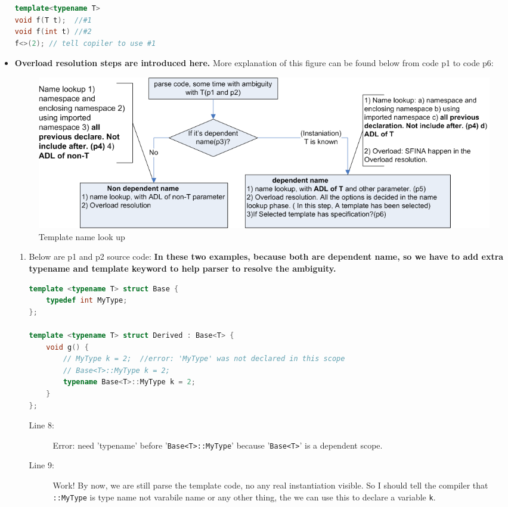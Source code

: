 \documentclass[a4paper,11pt,twoside]{book}
\begin{document}
\begin{itemize}
\begin{lstlisting}[frame=single, language=c++]
template<typename T>
void f(T t);  //#1
void f(int t) //#2
f<>(2); // tell copiler to use #1
\end{lstlisting}

    \item \textbf{Overload resolution steps are introduced here.} More explanation of this figure can be found below from code p1 to code p6:

\begin{figure}[ht]
	\centering 
	\includegraphics[width=0.8\linewidth]{pics/template.png}
	\caption{Template name look up}
	\label{fig:command}
\end{figure}

\begin{enumerate}

\item Below are p1 and p2 source code: \textbf{In these two examples, because both are dependent name, so we have to add extra typename and template keyword to help parser to resolve the ambiguity.}

\begin{lstlisting}[frame=single, language=c++]
template <typename T> struct Base {
	typedef int MyType;
};

template <typename T> struct Derived : Base<T> {
	void g() {
		// MyType k = 2;  //error: 'MyType' was not declared in this scope
		// Base<T>::MyType k = 2;		
		typename Base<T>::MyType k = 2;
	}
};
\end{lstlisting}
\begin{description}
	
	\item[Line 8:] Error: need 'typename' before '\texttt{Base<T>::MyType}' because '\texttt{Base<T>}' is a dependent scope.
	
	\item[Line 9:] Work! By now, we are still parse the template code, no any real instantiation visible. So I should tell the compiler that \texttt{::MyType} is type name not varabile name or any other thing, the we can use this to declare a variable \texttt{k}.
\end{description}


\end{enumerate}
\end{itemize}
\end{document}
